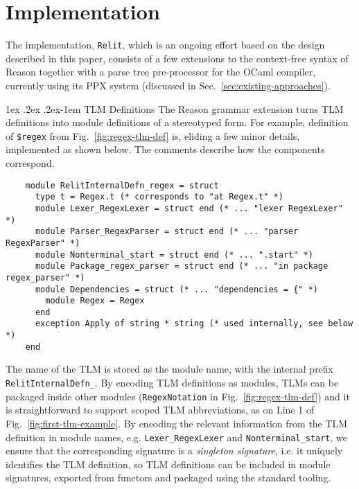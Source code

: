 \documentclass[acmsmall]{acmart}
\makeatletter
\renewcommand{\paragraph}{%
  \@startsection{paragraph}{4}%
  {\z@}{1ex \@plus .2ex \@minus .2ex}{-1em}%
  {\normalfont\normalsize\bfseries}%
}
\newcommand{\li}[1]{\lstinline[basicstyle=\ttfamily\fontsize{9pt}{1em}\selectfont]{#1}}
\makeatother
\begin{document}
\section{Implementation}
\label{sec:implementation}
The implementation, \li{Relit}, which is an ongoing effort based on the design described in this paper, consists of a few extensions to the context-free syntax of Reason together with a parse tree pre-processor for the OCaml compiler, currently using its PPX system (discussed in Sec.~\ref{sec:existing-approaches}).

\paragraph{TLM Definitions} The Reason grammar extension turns TLM definitions into module definitions of a stereotyped form. For example, definition of \li{$regex} from Fig.~\ref{fig:regex-tlm-def} is, eliding a few minor details, implemented as shown below. The comments describe how the components correspond. 

\begin{lstlisting}
    module RelitInternalDefn_regex = struct
      type t = Regex.t (* corresponds to "at Regex.t" *)
      module Lexer_RegexLexer = struct end (* ... "lexer RegexLexer" *)
      module Parser_RegexParser = struct end (* ... "parser RegexParser" *)
      module Nonterminal_start = struct end (* ... ".start" *)
      module Package_regex_parser = struct end (* ... "in package regex_parser" *)
      module Dependencies = struct (* ... "dependencies = {" *)
        module Regex = Regex
      end
      exception Apply of string * string (* used internally, see below *)
    end
\end{lstlisting}

The name of the TLM is stored as the module name, with the internal prefix \li{RelitInternalDefn_}. By encoding TLM definitions as modules, TLMs can be packaged inside other modules (\li{RegexNotation} in Fig.~\ref{fig:regex-tlm-def}) and it is straightforward to support scoped TLM abbreviations, as on Line 1 of Fig.~\ref{fig:first-tlm-example}. By encoding the relevant information from the TLM definition in module names, e.g. \li{Lexer_RegexLexer} and \li{Nonterminal_start}, we ensure that the corresponding signature is a \emph{singleton signature}, i.e. it uniquely identifies the TLM definition, so TLM definitions can be included in module signatures, exported from functors and packaged using the standard tooling.
\end{document}
